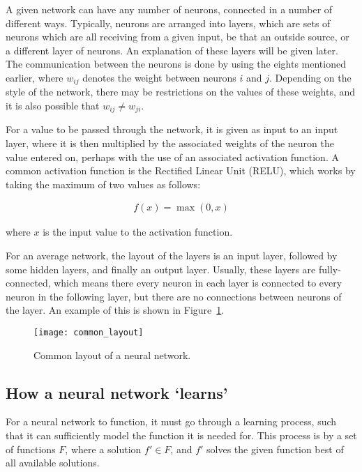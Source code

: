 A given network can have any number of neurons, connected in a number
of different ways. Typically, neurons are arranged into layers, which
are sets of neurons which are all receiving from a given input, be
that an outside source, or a different layer of neurons. An explanation of
these layers will be given later. The communication
between the neurons is done by using the eights mentioned earlier, where
$w_{ij}$ denotes the weight between neurons $i$ and $j$. Depending on the
style of the network, there may be restrictions on the values of these
weights, and it is also possible that $w_{ij} \ne w_{ji}$.

For a value to be passed through the network, it is given as input to an input
layer, where it is then multiplied by the associated weights of the neuron the
value entered on, perhaps with the use of an associated activation function. A
common activation function is the Rectified Linear Unit
(RELU)\cite{Nair:2010:RLU:3104322.3104425}, which works by taking the maximum
of two values as follows:

\begin{align}
    f(x) = \max(0, x)
\end{align}

where $x$ is the input value to the activation function.

For an average network, the layout of the layers is an input layer,
followed by some hidden layers, and finally an output layer. Usually,
these layers are fully-connected, which means there every neuron in each
layer is connected to every neuron in the following layer, but
there are no connections between neurons of the layer. An example of this
is shown in Figure~\ref{fig:common_layout}.

\begin{figure}
    \centering
    \texttt{[image: common\_layout]}
    \caption{Common layout of a neural network.}%
    \label{fig:common_layout}
\end{figure}

\subsection{How a neural network `learns'}

For a neural network to function, it must go through a learning process, such
that it can sufficiently model the function it is needed for. This process
is by a set of functions $F$, where a solution $f' \in F$, and $f'$ solves
the given function best of all available solutions.

